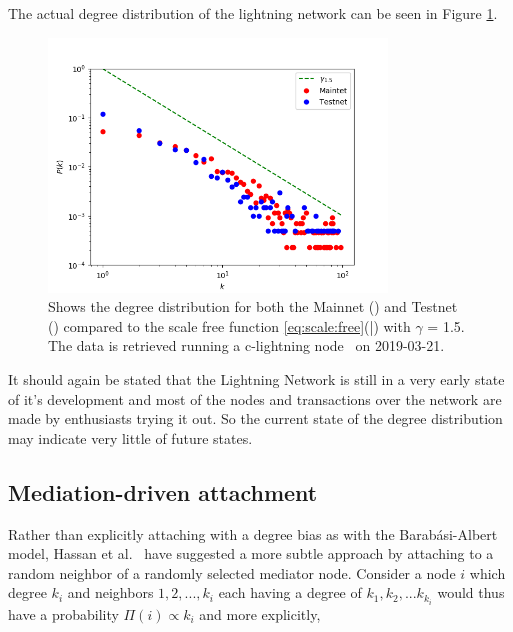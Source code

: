 
The actual degree distribution of the lightning network can be seen in Figure \ref{fig:real_network}.

\begin{figure}[!htb]
	\hspace*{-0.5cm} 
	\centering
	\includegraphics[width=9cm]{images/main-testnet_degree_distribution.png}
	\caption{Shows the degree distribution for both the Mainnet (\tikzcircle[red, fill=red]{2pt}) and Testnet (\tikzcircle[blue, fill=blue]{2pt})
		compared to the scale free function \ref{eq:scale:free}(\textcolor{black}{|}) with $\gamma$ = 1.5. The data is retrieved running a c-lightning node~\cite{repository:clightning} on 2019-03-21.
	}
	\label{fig:real_network}
	\hspace*{2mm}
\end{figure}

It should again be stated that the Lightning Network is still in a very early state of it's development and most of the nodes and transactions over the network are made by enthusiasts trying it out. So the current state of the \gls{degree distribution} may indicate very little of future states. 

\subsection{Mediation-driven attachment}

Rather than explicitly attaching with a degree bias as with the Barabási-Albert model, Hassan et al.~\cite{hassan:islam:haque:mediation} have suggested a more subtle approach by attaching to a random neighbor of a randomly selected mediator node. Consider a node $i$ which degree $k_i$ and neighbors $1,2,...,k_i$ each having a degree of $k_1, k_2, ... k_{k_i}$ would thus have a probability $\Pi(i) \propto k_i$ and more explicitly,

